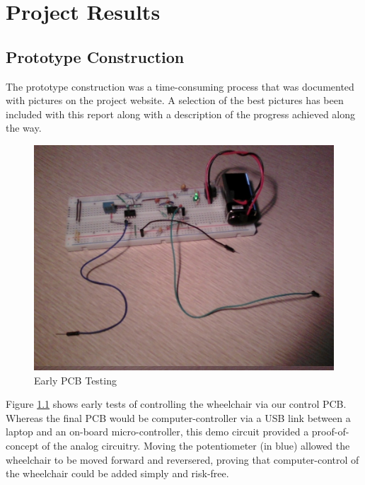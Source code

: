 \documentclass[oneside,final,a4paper]{report}
\begin{document}
\chapter{Project Results}

\section{Prototype Construction}

The prototype construction was a time-consuming process that was documented with pictures on the project website. A selection of the best pictures has been included with this report along with a description of the progress achieved along the way.

\begin{figure}[hbt]
 \centering
 \includegraphics[scale=0.35]{test_circuit}
 \caption{Early PCB Testing}
 \label{fig:testing_PCB}
\end{figure}

Figure \ref{fig:testing_PCB} shows early tests of controlling the wheelchair via our control PCB. Whereas the final PCB would be computer-controller via a USB link between a laptop and an on-board micro-controller, this demo circuit provided a proof-of-concept of the analog circuitry. Moving the potentiometer (in blue) allowed the wheelchair to be moved forward and reversered, proving that computer-control of the wheelchair could be added simply and risk-free.
\end{document}

